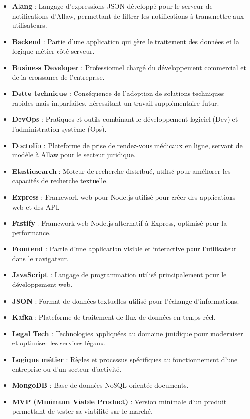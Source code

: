 
\begin{itemize}
\item {\bf Alang} : Langage d'expressions JSON développé pour le serveur de notifications d'Allaw, permettant de filtrer les notifications à transmettre aux utilisateurs.
\item {\bf Backend} : Partie d'une application qui gère le traitement des données et la logique métier côté serveur.
\item {\bf Business Developer} : Professionnel chargé du développement commercial et de la croissance de l'entreprise.
\item {\bf Dette technique} : Conséquence de l'adoption de solutions techniques rapides mais imparfaites, nécessitant un travail supplémentaire futur.
\item {\bf DevOps} : Pratiques et outils combinant le développement logiciel (Dev) et l'administration système (Ops).
\item {\bf Doctolib} : Plateforme de prise de rendez-vous médicaux en ligne, servant de modèle à Allaw pour le secteur juridique.
\item {\bf Elasticsearch} : Moteur de recherche distribué, utilisé pour améliorer les capacités de recherche textuelle.
\item {\bf Express} : Framework web pour Node.js utilisé pour créer des applications web et des API.
\item {\bf Fastify} : Framework web Node.js alternatif à Express, optimisé pour la performance.
\item {\bf Frontend} : Partie d'une application visible et interactive pour l'utilisateur dans le navigateur.
\item {\bf JavaScript} : Langage de programmation utilisé principalement pour le développement web.
\item {\bf JSON} : Format de données textuelles utilisé pour l'échange d'informations.
\item {\bf Kafka} : Plateforme de traitement de flux de données en temps réel.
\item {\bf Legal Tech} : Technologies appliquées au domaine juridique pour moderniser et optimiser les services légaux.
\item {\bf Logique métier} : Règles et processus spécifiques au fonctionnement d'une entreprise ou d'un secteur d'activité.
\item {\bf MongoDB} : Base de données NoSQL orientée documents.
\item {\bf MVP (Minimum Viable Product)} : Version minimale d'un produit permettant de tester sa viabilité sur le marché.

\end{itemize}
